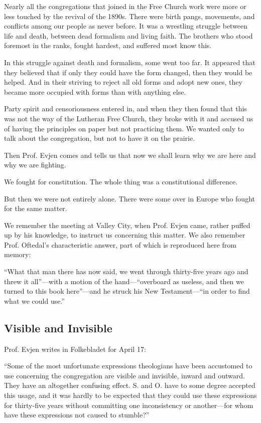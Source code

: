 Nearly all the congregations that joined in the Free Church work were more or less touched by the revival of the 1890s. There were birth pangs, movements, and conflicts among our people as never before. It was a wrestling struggle between life and death, between dead formalism and living faith. The brothers who stood foremost in the ranks, fought hardest, and suffered most know this.

In this struggle against death and formalism, some went too far. It appeared that they believed that if only they could have the form changed, then they would be helped. And in their striving to reject all old forms and adopt new ones, they became more occupied with forms than with anything else.

Party spirit and censoriousness entered in, and when they then found that this was not the way of the Lutheran Free Church, they broke with it and accused us of having the principles on paper but not practicing them. We wanted only to talk about the congregation, but not to have it on the prairie.

Then Prof. Evjen comes and tells us that now we shall learn why we are here and why we are fighting.

We fought for constitution. The whole thing was a constitutional difference.

But then we were not entirely alone. There were some over in Europe who fought for the same matter.

We remember the meeting at Valley City, when Prof. Evjen came, rather puffed up by his knowledge, to instruct us concerning this matter. We also remember Prof. Oftedal’s characteristic answer, part of which is reproduced here from memory:

“What that man there has now said, we went through thirty-five years ago and threw it all”—with a motion of the hand—“overboard as useless, and then we turned to this book here”—and he struck his New Testament—“in order to find what we could use.”

\subsection{Visible and Invisible}

Prof. Evjen writes in Folkebladet for April 17:

“Some of the most unfortunate expressions theologians have been accustomed to use concerning the congregation are visible and invisible, inward and outward. They have an altogether confusing effect. S. and O. have to some degree accepted this usage, and it was hardly to be expected that they could use these expressions for thirty-five years without committing one inconsistency or another—for whom have these expressions not caused to stumble?”

